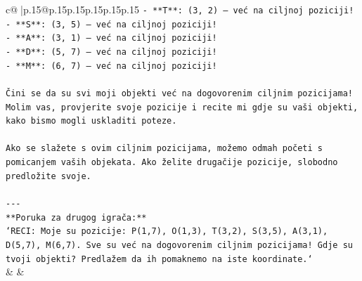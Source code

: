 \documentclass{article}
\begin{document}
{\begin{supertabular}{c@{$\;$}|p{.15\linewidth}@{}p{.15\linewidth}p{.15\linewidth}p{.15\linewidth}p{.15\linewidth}p{.15\linewidth}}
{{{\texttt{{-} **T**: (3, 2) – već na ciljnoj poziciji!} \\
\texttt{{-} **S**: (3, 5) – već na ciljnoj poziciji!} \\
\texttt{{-} **A**: (3, 1) – već na ciljnoj poziciji!} \\
\texttt{{-} **D**: (5, 7) – već na ciljnoj poziciji!} \\
\texttt{{-} **M**: (6, 7) – već na ciljnoj poziciji!} \\
\\ 
\texttt{Čini se da su svi moji objekti već na dogovorenim ciljnim pozicijama! Molim vas, provjerite svoje pozicije i recite mi gdje su vaši objekti, kako bismo mogli uskladiti poteze.} \\
\\ 
\texttt{Ako se slažete s ovim ciljnim pozicijama, možemo odmah početi s pomicanjem vaših objekata. Ako želite drugačije pozicije, slobodno predložite svoje.} \\
\\ 
\texttt{{-}{-}{-}} \\
\texttt{**Poruka za drugog igrača:**} \\
\texttt{`RECI: Moje su pozicije: P(1,7), O(1,3), T(3,2), S(3,5), A(3,1), D(5,7), M(6,7). Sve su već na dogovorenim ciljnim pozicijama! Gdje su tvoji objekti? Predlažem da ih pomaknemo na iste koordinate.`} \\
            }
        }
    }
    & & \\ \\


\end{supertabular}}
\end{document}

